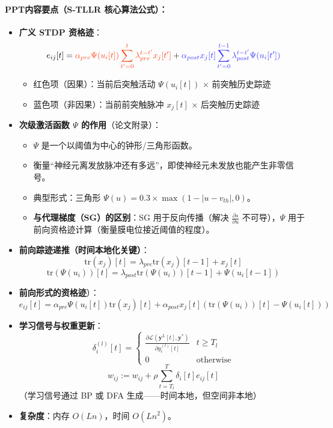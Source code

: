 \documentclass[journal,12pt,onecolumn]{IEEEtran}
\begin{document}
\paragraph{\textbf{PPT内容要点（S-TLLR 核心算法公式）：}}
\begin{itemize}
    \item \textbf{广义 STDP 资格迹}\cite{apolinario_s-tllr_2024}：
    \[
    e_{ij}[t] = {\color{myred}\alpha_{pre}\Psi(u_i[t])\sum_{t'=0}^{t}\lambda_{pre}^{t-t'} x_j[t']}
    + {\color{myblue}\alpha_{post} x_j[t]\sum_{t'=0}^{t-1}\lambda_{post}^{t-t'} \Psi(u_i[t'])}
    \]
    \begin{itemize}
        \item {\color{myred}红色项（因果）}：当前后突触活动 \(\Psi(u_i[t])\) × 前突触历史踪迹
        \item {\color{myblue}蓝色项（非因果）}：当前前突触脉冲 \(x_j[t]\) × 后突触历史踪迹
    \end{itemize}
    
    \item \textbf{次级激活函数 \(\Psi\) 的作用}（论文附录）：
    \begin{itemize}
        \item \(\Psi\) 是一个以阈值为中心的钟形/三角形函数。
        \item 衡量“神经元离发放脉冲还有多远”，即使神经元未发放也能产生非零信号。
        \item 典型形式：三角形 \(\Psi(u) = 0.3 \times \max(1 - |u - v_{th}|, 0)\)。
        \item \textbf{与代理梯度（SG）的区别}：SG 用于反向传播（解决 \(\frac{\partial s}{\partial u}\) 不可导），\(\Psi\) 用于前向资格迹计算（衡量膜电位接近阈值的程度）。
    \end{itemize}
    
    \item \textbf{前向踪迹递推（时间本地化关键）}：
    \[
    \text{tr}(x_j)[t] = \lambda_{pre}\text{tr}(x_j)[t-1] + x_j[t]
    \]
    \[
    \text{tr}(\Psi(u_i))[t] = \lambda_{post}\text{tr}(\Psi(u_i))[t-1] + \Psi(u_i[t-1])
    \]
    
    \item \textbf{前向形式的资格迹}\cite{apolinario_s-tllr_2024}）：
    \[
    e_{ij}[t] = \alpha_{pre}\Psi(u_i[t])\text{tr}(x_j)[t] + \alpha_{post}x_j[t]\left(\text{tr}(\Psi(u_i))[t] - \Psi(u_i[t])\right)
    \]
    
    \item \textbf{学习信号与权重更新}\cite{apolinario_s-tllr_2024}：
    \[
    \delta_i^{(l)}[t] = 
    \begin{cases}
        \frac{\partial \mathcal{L}(\mathbf{y}^L[t], \mathbf{y}^*)}{\partial y_i^{(l)}[t]} & t \ge T_l \\
        0 & \text{otherwise}
    \end{cases}
    \]
    \[
    w_{ij} := w_{ij} + \rho \sum_{t=T_l}^{T} \delta_i[t] e_{ij}[t]
    \]
    （学习信号通过 BP 或 DFA 生成——时间本地，但空间非本地）
    
    \item \textbf{复杂度}：内存 \(O(Ln)\)，时间 \(O(Ln^2)\)。
\end{itemize}
\end{document}
